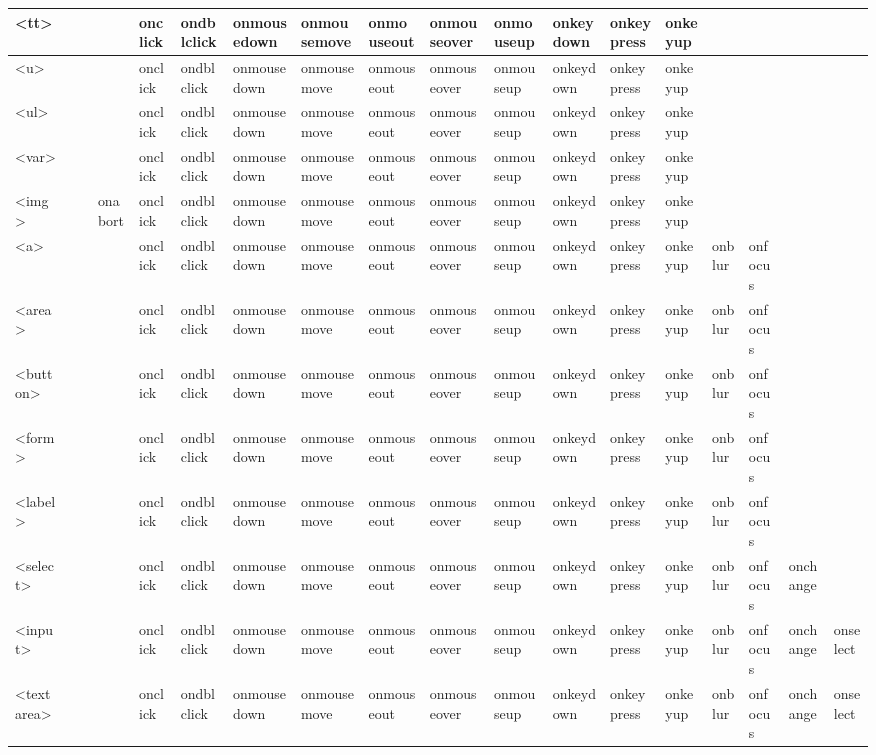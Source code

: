 \begin{center}
\begin{landscape}
\begin{longtable}{|l|l|l|l|l|l|l|l|l|l|l|l|l|l|l|l|l|l|}
\hline
<tt>			&	&	&	& onclick	& ondblclick & onmousedown & onmousemove & onmouseout & onmouseover & onmouseup & onkeydown & onkeypress & onkeyup & & & & \\
\hline
<u>			&	&	&	& onclick	& ondblclick & onmousedown & onmousemove & onmouseout & onmouseover & onmouseup & onkeydown & onkeypress & onkeyup & & & & \\
\hline
<ul>			&	&	&	& onclick	& ondblclick & onmousedown & onmousemove & onmouseout & onmouseover & onmouseup & onkeydown & onkeypress & onkeyup & & & & \\
\hline
<var>		&	&	&	& onclick	& ondblclick & onmousedown & onmousemove & onmouseout & onmouseover & onmouseup & onkeydown & onkeypress & onkeyup & & & & \\
\hline
<img>		&	&	&onabort	& onclick	& ondblclick & onmousedown & onmousemove & onmouseout & onmouseover & onmouseup & onkeydown & onkeypress & onkeyup & & & & \\
\hline
<a>			&	&	&	& onclick	& ondblclick & onmousedown & onmousemove & onmouseout & onmouseover & onmouseup & onkeydown & onkeypress & onkeyup &onblur &onfocus & & \\				
\hline
<area>		&	&	&	& onclick	& ondblclick & onmousedown & onmousemove & onmouseout & onmouseover & onmouseup & onkeydown & onkeypress & onkeyup &onblur &onfocus & & \\				
\hline
<button>		&	&	&	& onclick	& ondblclick & onmousedown & onmousemove & onmouseout & onmouseover & onmouseup & onkeydown & onkeypress & onkeyup &onblur &onfocus & & \\				
\hline
<form>		&	&	&	& onclick	& ondblclick & onmousedown & onmousemove & onmouseout & onmouseover & onmouseup & onkeydown & onkeypress & onkeyup &onblur &onfocus & & \\				
\hline
<label>		&	&	&	& onclick	& ondblclick & onmousedown & onmousemove & onmouseout & onmouseover & onmouseup & onkeydown & onkeypress & onkeyup &onblur &onfocus & & \\				
\hline
<select>		&	&	&	& onclick	& ondblclick & onmousedown & onmousemove & onmouseout & onmouseover & onmouseup & onkeydown & onkeypress & onkeyup &onblur &onfocus &onchange & \\				
\hline
<input>		&	&	&	& onclick	& ondblclick & onmousedown & onmousemove & onmouseout & onmouseover & onmouseup & onkeydown & onkeypress & onkeyup &onblur &onfocus &onchange &onselect \\				
\hline
<textarea>	&	&	&	& onclick	& ondblclick & onmousedown & onmousemove & onmouseout & onmouseover & onmouseup & onkeydown & onkeypress & onkeyup &onblur &onfocus &onchange &onselect \\				
\hline
\end{longtable}
\end{landscape}
\end{center}


